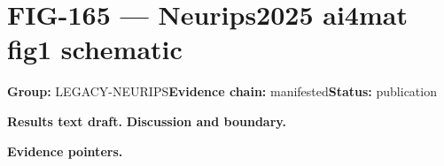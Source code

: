\clearpage
\section{FIG-165 --- Neurips2025 ai4mat fig1 schematic}
\label{figpage:fig-165}
\textbf{Group:} LEGACY-NEURIPS\quad \textbf{Evidence chain:} manifested\quad \textbf{Status:} publication

\textbf{Results text draft.} 
\textbf{Discussion and boundary.} 


\textbf{Evidence pointers.}



\vfill
